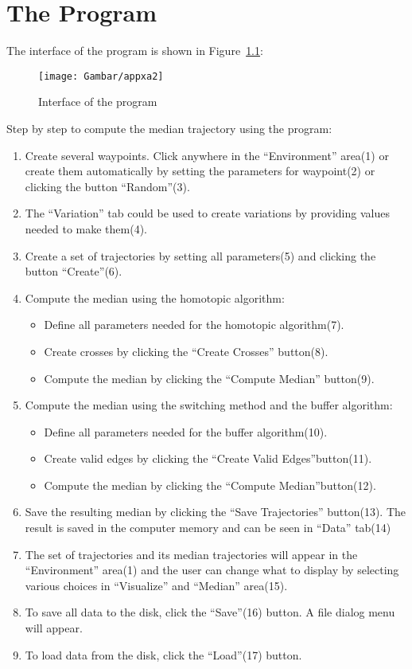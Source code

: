 \chapter{The Program}
\label{app:A}

The interface of the program is shown in Figure~\ref{fig:appxa2}:

\begin{figure}[H]
\centering
\texttt{[image: Gambar/appxa2]}
\caption[Interface of the program]{Interface of the program} 
\label{fig:appxa2}
\end{figure}

Step by step to compute the median trajectory using the program:
\begin{enumerate}
\item
Create several waypoints. 
Click anywhere in the ``Environment'' area(1) or create them automatically by setting the parameters for waypoint(2) or clicking the button ``Random''(3).
\item
The ``Variation'' tab could be used to create variations by providing values needed to make them(4).
\item
Create a set of trajectories by setting all parameters(5) and clicking the button ``Create''(6).
\item
Compute the median using the homotopic algorithm: 
\begin{itemize}
\item Define all parameters needed for the homotopic algorithm(7).
\item Create crosses by clicking the ``Create Crosses'' button(8).\item Compute the median by clicking the ``Compute Median'' button(9).
\end{itemize}
\item
Compute the median using the switching method and the buffer algorithm: 
\begin{itemize}
\item Define all parameters needed for the buffer algorithm(10).
\item Create valid edges by clicking the ``Create Valid Edges''button(11). 
\item Compute the median by clicking the ``Compute Median''button(12).
\end{itemize}
\item
Save the resulting median by clicking the ``Save Trajectories'' button(13).
The result is saved in the computer memory and can be seen in ``Data'' tab(14) 
\item 
The set of trajectories and its median trajectories will appear in the ``Environment'' area(1) and the user can change what to display by selecting various choices in ``Visualize'' and ``Median'' area(15).
\item
To save all data to the disk, click the ``Save''(16) button. A file dialog menu will appear.
\item
To load data from the disk, click the ``Load''(17) button.
\end{enumerate}